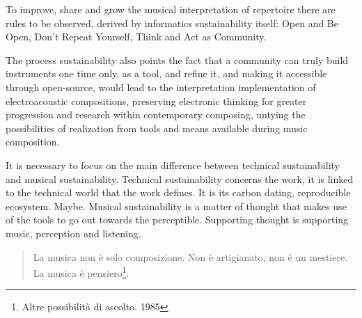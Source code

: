 \documentclass[twoside,a4paper]{article}
\begin{document}
To improve, share and grow the musical interpretation of repertoire there are rules to be observed, derived by informatics sustainability itself: Open and Be Open, Don't Repeat Yourself, Think and Act as Community.

The process sustainability also points the fact that a community can truly build instruments one time only, as a tool, and refine it, and making it accessible through open-source, would lead to the interpretation implementation of electroacoustic compositions, preserving electronic thinking for greater progression and research within contemporary composing, untying the possibilities of realization from tools and means available during music composition.

It is necessary to focus on the main difference between technical sustainability and musical sustainability. Technical sustainability concerns the work, it is linked to the technical world that the work defines. It is its carbon dating, reproducible ecosystem. Maybe. Musical sustainability is a matter of thought that makes use of the tools to go out towards the perceptible. Supporting thought is supporting music, perception and listening.

\begin{quote}
La musica non è solo composizione. Non è artigianato, non è un mestiere. La musica è pensiero\footnote{Altre possibilità di ascolto. 1985}.
\end{quote}
%

\nocite{*}

%
%
%
\end{document}
